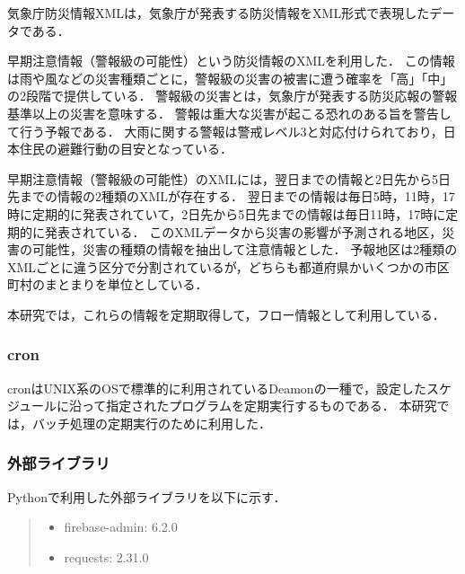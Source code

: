気象庁防災情報XML\cite{KishoutyouXML}は，気象庁が発表する防災情報をXML形式で表現したデータである．\par
早期注意情報（警報級の可能性）という防災情報のXMLを利用した．
この情報は雨や風などの災害種類ごとに，警報級の災害の被害に遭う確率を「高」「中」の2段階で提供している．
警報級の災害とは，気象庁が発表する防災応報の警報基準以上の災害を意味する．
警報は重大な災害が起こる恐れのある旨を警告して行う予報である．
大雨に関する警報は警戒レベル3と対応付けられており，日本住民の避難行動の目安となっている．\par
早期注意情報（警報級の可能性）のXMLには，翌日までの情報と2日先から5日先までの情報の2種類のXMLが存在する．
翌日までの情報は毎日5時，11時，17時に定期的に発表されていて，2日先から5日先までの情報は毎日11時，17時に定期的に発表されている．
このXMLデータから災害の影響が予測される地区，災害の可能性，災害の種類の情報を抽出して注意情報とした．
予報地区は2種類のXMLごとに違う区分で分割されているが，どちらも都道府県かいくつかの市区町村のまとまりを単位としている．\par
本研究では，これらの情報を定期取得して，フロー情報として利用している．

\subsubsection{cron}
cronはUNIX系のOSで標準的に利用されているDeamonの一種で，設定したスケジュールに沿って指定されたプログラムを定期実行するものである．
本研究では，バッチ処理の定期実行のために利用した．

\subsubsection{外部ライブラリ}
Pythonで利用した外部ライブラリを以下に示す．

\begin{quote}
  \begin{itemize}
    \item firebase-admin: 6.2.0
    \item requests: 2.31.0
  \end{itemize}
\end{quote}